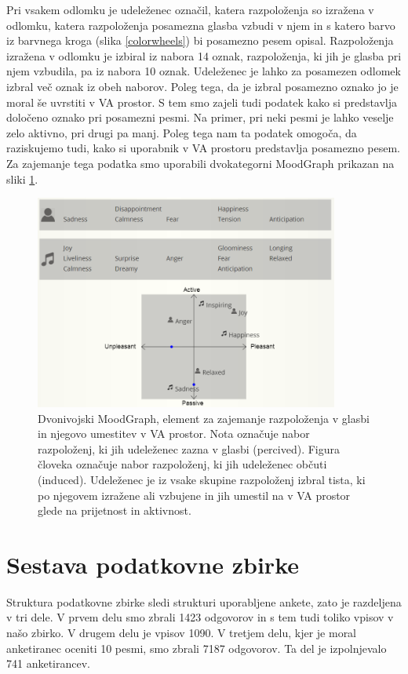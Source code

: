 \documentclass[a4paper, 12pt]{book}
\begin{document}
{Pri vsakem odlomku je udeleženec označil, katera razpoloženja so izražena v odlomku, katera razpoloženja posamezna glasba vzbudi v njem in s katero barvo iz barvnega kroga (slika \ref{colorwheels}) bi posamezno pesem opisal. Razpoloženja izražena v odlomku je izbiral iz nabora 14 oznak, razpoloženja, ki jih je glasba pri njem vzbudila, pa iz nabora 10 oznak. Udeleženec je lahko za posamezen odlomek izbral več oznak iz obeh naborov. Poleg tega, da je izbral posamezno oznako jo je moral še uvrstiti v VA prostor. S tem smo zajeli tudi podatek kako si predstavlja določeno oznako pri posamezni pesmi. Na primer, pri neki pesmi je lahko veselje zelo aktivno, pri drugi pa manj. Poleg tega nam ta podatek omogoča, da raziskujemo tudi, kako si uporabnik v VA prostoru predstavlja posamezno pesem. Za zajemanje tega podatka smo uporabili dvokategorni MoodGraph prikazan na sliki \ref{moodgraphdvo}.

\begin{figure}[htb]
\centering
\includegraphics[width=10cm]{images/moodgraphdvo.png}

\caption{Dvonivojski MoodGraph, element za zajemanje razpoloženja v glasbi in njegovo umestitev v VA prostor. Nota označuje nabor razpoloženj, ki jih udeleženec zazna v glasbi (percived). Figura človeka označuje nabor razpoloženj, ki jih udeleženec občuti (induced). Udeleženec je iz vsake skupine razpoloženj izbral tista, ki po njegovem izražene ali vzbujene in jih umestil na v VA prostor glede na prijetnost in aktivnost.}
\label{moodgraphdvo}
\end{figure}


\section{Sestava podatkovne zbirke}

Struktura podatkovne zbirke sledi strukturi uporabljene ankete, zato je razdeljena v tri dele.  V prvem delu smo zbrali 1423 odgovorov in s tem tudi toliko vpisov v našo zbirko. V drugem delu je vpisov 1090. V tretjem delu, kjer je moral anketiranec oceniti 10 pesmi, smo zbrali 7187 odgovorov. Ta del je izpolnjevalo 741 anketirancev.

}
\end{document}
